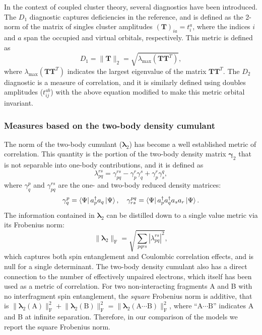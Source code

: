 \documentclass[aip,jcp,amsmath,amssymb, reprint]{revtex4-1}
\providecommand{\norm}[1]{\lVert#1\rVert}
\begin{document}
In the context of coupled cluster theory, several diagnostics have been introduced.
The $D_1$ diagnostic captures deficiencies in the reference, and is defined as the 2-norm of the matrix of singles cluster amplitudes $(\mathbf{T})_{ia} = t_i^a$, where the indices $i$ and $a$ span the occupied and virtual orbitals, respectively.
This metric is defined as
\begin{equation}
D_1 = \| \mathbf{T} \|_2 = \sqrt{\lambda_{\max} (\mathbf{TT}^T)},
\end{equation}
where $\lambda_{\max} (\mathbf{TT}^T)$ indicates the largest eigenvalue of the matrix $\mathbf{TT}^T$.
The $D_2$ diagnostic is a measure of correlation, and it is similarly defined using doubles amplitudes ($t_{ij}^{ab}$) with the above equation modified to make this metric orbital invariant.\cite{nielsen1999double}

\subsubsection{Measures based on the two-body density cumulant}

The norm of the two-body cumulant ($\pmb{ \lambda}_{2}$) has become a well established metric of correlation.\cite{Luzanov2005IrreducibleCharge,  Huang2006Entanglement, Juhasz2006TheCumulant, Luzanova2007HighOrder, Alcoba2010OnThe}
This quantity is the portion of the two-body density matrix $\pmb{ \gamma}_{2}$ that is not separable into one-body contributions, and it is defined as
\begin{equation}
\lambda_{pq}^{rs} = \gamma_{pq}^{rs}
- \gamma_{p}^{r} \gamma_{q}^{s}
+ \gamma_{p}^{r} \gamma_{s}^{q},
\end{equation}
where $\gamma^{p}_{q} $ and $\gamma_{pq}^{rs}$ are the one- and two-body reduced density matrices:
\begin{align}
\gamma^{p}_{q} = \bra{\Psi} a_{p}^{\dagger} a_{q} \ket{\Psi}, \quad 
\gamma^{pq}_{rs} = \bra{\Psi} a_{p}^{\dagger} a_{q}^{\dagger} a_{s}  a_{r} \ket{\Psi}.
\end{align}
The information contained in $\pmb{ \lambda}_{2}$ can be distilled down to a single value metric via its Frobenius norm:
\begin{equation}
\norm{\pmb{ \lambda}_{2}}_\mathrm{F} = \sqrt{\sum_{pqrs} |\lambda_{pq}^{rs}|^{2}},
\end{equation}
which captures both spin entanglement and Coulombic correlation effects,\cite{Juhasz2006TheCumulant, Alcoba2010OnThe} and is null for a single determinant.
The two-body density cumulant also has a direct connection to the number of effectively unpaired electrons, which itself has been used as a metric of correlation.\cite{Bochicchio1998OnSpin, Lain2009ADecomposition, Alcoba2006OnTheDefinition}
For two non-interacting fragments A and B with no interfragment spin entanglement, the \textit{square} Frobenius norm is additive,\cite{Juhasz2006TheCumulant,Alcoba2010OnThe} that is $\norm{\pmb{ \lambda}_{2}(\mathrm{A})}^2_\mathrm{F} +\norm{\pmb{ \lambda}_{2}(\mathrm{B})}^2_\mathrm{F} = \norm{\pmb{ \lambda}_{2}(\mathrm{A}\cdots\mathrm{B})}^2_\mathrm{F}$, where ``$\mathrm{A}\cdots\mathrm{B}$'' indicates A and B at infinite separation. Therefore, in our comparison of the models we report the square Frobenius norm.
\end{document}
